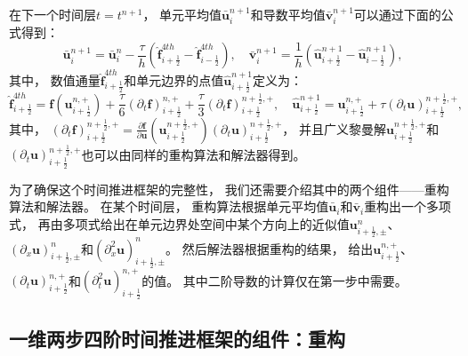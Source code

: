 在下一个时间层$t=t^{n+1}$，
单元平均值$\bar{\bm{u}}_{i}^{n+1}$和导数平均值$\bar{\bm{v}}_{i}^{n+1}$可以通过下面的公式得到：
\begin{equation}
  \bar{\bm{u}}_{i}^{n+1}=\bar{\bm{u}}_{i}^{n}-\frac{\tau}{ h} \left(\hat{\bm{f}}_{i+\frac 12}^{4th}-\hat{\bm{f}}_{i-\frac 12}^{4th}\right), \quad
  \bar{\bm{v}}_{i}^{n+1}=\frac{1}{h} \left(\hat {\bm{u}}_{i+\frac 12}^{n+1}-\hat {\bm{u}}_{i-\frac 12}^{n+1}\right),
\end{equation}
其中，
数值通量$\hat{\bm{f}}_{i+\frac 12}^{4th}$和单元边界的点值$\hat {\bm{u}}_{i+\frac 12}^{n+1}$定义为：
\begin{equation}
  \hat{\bm{f}}^{4th}_{i+\frac{1}{2}}={\bm{f}} \left({\bm{u}}_{i+\frac{1}{2}}^{n, +}\right) +\frac{\tau}{6} \left({\partial_{t}}{\bm{f}}\right)_{i+\frac{1}{2}}^{n, +}+\frac{\tau}{3} \left({\partial_{t}}{\bm{f}}\right)_{i+\frac{1}{2}}^{n+\frac12, +}, \quad
  \hat {\bm{u}}_{i+\frac{1}{2}}^{n+1}={\bm{u}}_{i+\frac{1}{2}}^{n, +}+\tau \left({\partial_{t}}{\bm{u}}\right)_{i+\frac{1}{2}}^{n+\frac{1}{2}, +},
\end{equation}
其中，
$\left({\partial_{t}}{\bm{f}}\right)_{i+\frac{1}{2}}^{n+\frac{1}{2}, +} = \frac{\partial{\bm{f}}}{\partial{\bm{u}}}\left({\bm{u}}_{i+\frac{1}{2}}^{n+\frac{1}{2}, +}\right) \left({\partial_{t}}{\bm{u}}\right)_{i+\frac{1}{2}}^{n+\frac{1}{2}, +}$，
并且广义黎曼解${\bm{u}}_{i+\frac{1}{2}}^{n+\frac{1}{2}, +}$和$\left({\partial_{t}}{\bm{u}}\right)_{i+\frac{1}{2}}^{n+\frac{1}{2}, +}$也可以由同样的重构算法和解法器得到。
\vspace{0.3\baselineskip} %

为了确保这个时间推进框架的完整性，
我们还需要介绍其中的两个组件——重构算法和解法器。
在某个时间层，
重构算法根据单元平均值$\bar{\bm{u}}_{i}$和$\bar{\bm{v}}_{i}$重构出一个多项式，
再由多项式给出在单元边界处空间中某个方向上的近似值${\bm{u}}_{i+\frac{1}{2},\pm}^n$、$\left({\partial_{x}}{\bm{u}}\right)_{i+\frac{1}{2},\pm}^n$和$\left({\partial_{x}^2}{\bm{u}}\right)_{i+\frac{1}{2},\pm}^n$。
然后解法器根据重构的结果，
给出${\bm{u}}_{i+\frac{1}{2}}^{n, +}$、$\left({\partial_{t}}{\bm{u}}\right)_{i+\frac{1}{2}}^{n, +}$和$\left({\partial_{t}^2}{\bm{u}}\right)_{i+\frac{1}{2}}^{n, +}$的值。
其中二阶导数的计算仅在第一步中需要。

\subsection{一维两步四阶时间推进框架的组件：重构}


